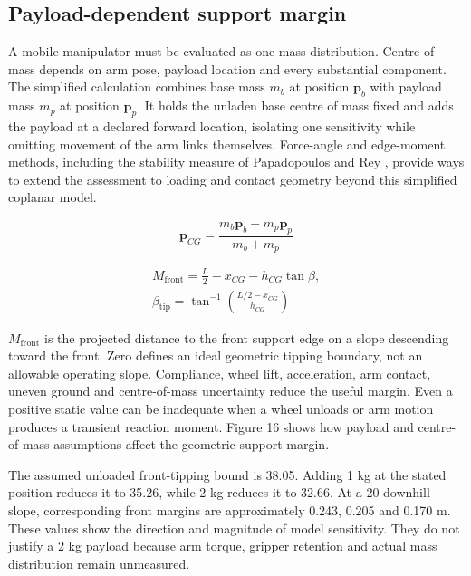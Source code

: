 \documentclass[11pt,a4paper]{article}
\begin{document}
\FloatBarrier

\subsection{Payload-dependent support margin}\label{sec:6.2}

A mobile manipulator must be evaluated as one mass distribution. Centre of mass depends on arm pose, payload location and every substantial component. The simplified calculation combines base mass \(m_b\) at position \(\mathbf{p}_b\) with payload mass \(m_p\) at position \(\mathbf{p}_p\). It holds the unladen base centre of mass fixed and adds the payload at a declared forward location, isolating one sensitivity while omitting movement of the arm links themselves. Force-angle and edge-moment methods, including the stability measure of Papadopoulos and Rey \citep{papadopoulos1996_3a8aa9}, provide ways to extend the assessment to loading and contact geometry beyond this simplified coplanar model.

\begin{equation}
\label{eq:7}
\mathbf{p}_{CG}=\frac{m_b\mathbf{p}_b+m_p\mathbf{p}_p}{m_b+m_p}
\end{equation}

\begin{equation}
\label{eq:8}
\begin{gathered}
M_{\mathrm{front}}=\frac{L}{2}-x_{CG}-h_{CG}\tan\beta, \\ \beta_{\mathrm{tip}}=\tan^{-1}\!\left(\frac{L/2-x_{CG}}{h_{CG}}\right)
\end{gathered}
\end{equation}

\(M_{\mathrm{front}}\) is the projected distance to the front support edge on a slope descending toward the front. Zero defines an ideal geometric tipping boundary, not an allowable operating slope. Compliance, wheel lift, acceleration, arm contact, uneven ground and centre-of-mass uncertainty reduce the useful margin. Even a positive static value can be inadequate when a wheel unloads or arm motion produces a transient reaction moment. Figure 16 shows how payload and centre-of-mass assumptions affect the geometric support margin.

The assumed unloaded front-tipping bound is 38.05\textdegree{}. Adding 1 kg at the stated position reduces it to 35.26\textdegree{}, while 2 kg reduces it to 32.66\textdegree{}. At a 20\textdegree{} downhill slope, corresponding front margins are approximately 0.243, 0.205 and 0.170 m. These values show the direction and magnitude of model sensitivity. They do not justify a 2 kg payload because arm torque, gripper retention and actual mass distribution remain unmeasured.
\end{document}
